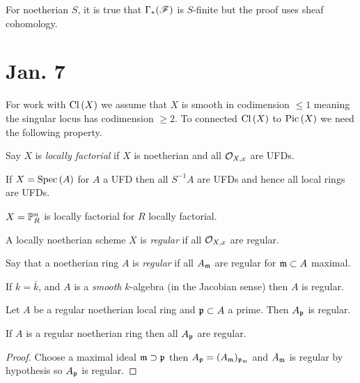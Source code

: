 \documentclass[12pt]{article}
\begin{document}
\begin{rmk}
For noetherian $S$, it is true that $\Gamma_*(\F)$ is $S$-finite but the proof uses sheaf cohomology.
\end{rmk}

\section{Jan. 7}

For work with $\Cl{X}$ we assume that $X$ is smooth in codimension $\le 1$ meaning the singular locus has codimension $\ge 2$. To connected $\Cl{X}$ to $\Pic{X}$ we need the following property.

\begin{defn}
Say $X$ is \textit{locally factorial} if $X$ is noetherian and all $\stalk{X}{x}$ are UFDs.
\end{defn}

\begin{example}
If $X = \Spec{A}$ for $A$ a UFD then all $S^{-1} A$ are UFDs and hence all local rings are UFDs.
\end{example}

\begin{example}
$X = \P^n_R$ is locally factorial for $R$ locally factorial.
\end{example}

\begin{defn}
A locally noetherian scheme $X$ is \textit{regular} if all $\stalk{X}{x}$ are regular.
\end{defn}

\begin{defn}
Say that a noetherian ring $A$ is \textit{regular} if all $A_\m$ are regular for $\m \subset A$ maximal.
\end{defn}

\begin{example}
If $k = \bar{k}$, and $A$ is a \textit{smooth} $k$-algebra (in the Jacobian sense) then $A$ is regular.
\end{example}

\begin{thm}[Serre]
Let $A$ be a regular noetherian local ring and $\p \subset A$ a prime. Then $A_\p$ is regular.
\end{thm}

\begin{cor}
If $A$ is a regular noetherian ring then all $A_\p$ are regular.
\end{cor}

\begin{proof}
Choose a maximal ideal $\m \supset \p$ then $A_\p = (A_\m)_{\p_\m}$ and $A_\m$ is regular by hypothesis so $A_\p$ is regular.
\end{proof}
\end{document}
